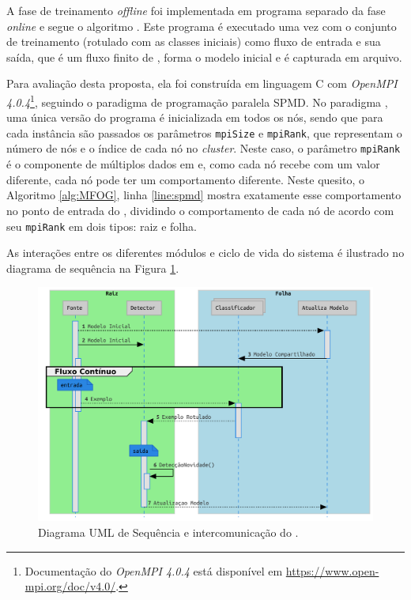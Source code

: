 A fase de treinamento \emph{offline} foi implementada em programa separado da
fase \emph{online} e segue o algoritmo \minas \cite{Faria2016minas}.
Este programa é executado uma vez com o conjunto de treinamento (rotulado com as
classes iniciais) como fluxo de entrada e sua saída, que é um fluxo finito de
\mclusters, forma o modelo inicial e é capturada em arquivo.


Para avaliação desta proposta, ela foi construída em linguagem C com
\emph{OpenMPI 4.0.4}\footnote{
    Documentação do \emph{OpenMPI 4.0.4} está disponível em \url{https://www.open-mpi.org/doc/v4.0/}.
}, seguindo o paradigma de programação
paralela \acf{SPMD}.
No paradigma \spmd, uma única versão do programa é inicializada em todos os nós, sendo que
para cada instância são passados os parâmetros \texttt{mpiSize} e
\texttt{mpiRank}, que representam o número de nós e o índice de cada nó no
\emph{cluster}.
Neste caso, o parâmetro \texttt{mpiRank} é o componente de múltiplos dados em
\spmd e, como cada nó recebe com um valor diferente, cada nó pode ter um
comportamento diferente.
Neste quesito, o Algoritmo \ref{alg:MFOG}, linha \ref{line:spmd} mostra
exatamente esse comportamento no ponto de entrada do \mfog, dividindo o
comportamento de cada nó de acordo com seu \texttt{mpiRank} em dois tipos: raiz
e folha.

As interações entre os diferentes módulos e ciclo de vida do sistema é ilustrado
no diagrama de sequência na Figura \ref{fig:mfog-mpi-life}.

\begin{figure}[htb]
  \centerline{
    \includegraphics[width=0.80\linewidth,page=1]{figures/lifecycle-uml-svg.pdf}
  }
  \caption{Diagrama UML de Sequência e intercomunicação do \mfog.}
  \label{fig:mfog-mpi-life}
\end{figure}

